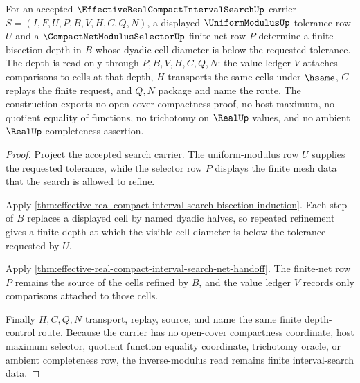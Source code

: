 \begin{theorem}
\label{thm:effective-real-compact-interval-search-dyadic-bisection-inverse-modulus}
For an accepted $\EffectiveRealCompactIntervalSearchUp$ carrier $S=(I,F,U,P,B,V,H,C,Q,N)$, a displayed $\UniformModulusUp$ tolerance row $U$ and a $\CompactNetModulusSelectorUp$ finite-net row $P$ determine a finite bisection depth in $B$ whose dyadic cell diameter is below the requested tolerance. The depth is read only through $P,B,V,H,C,Q,N$: the value ledger $V$ attaches comparisons to cells at that depth, $H$ transports the same cells under $\hsame$, $C$ replays the finite request, and $Q,N$ package and name the route. The construction exports no open-cover compactness proof, no host maximum, no quotient equality of functions, no trichotomy on $\RealUp$ values, and no ambient $\RealUp$ completeness assertion.
\end{theorem}
\begin{proof}
Project the accepted search carrier. The uniform-modulus row $U$ supplies the requested tolerance, while the selector row $P$ displays the finite mesh data that the search is allowed to refine.

Apply \autoref{thm:effective-real-compact-interval-search-bisection-induction}. Each step of $B$ replaces a displayed cell by named dyadic halves, so repeated refinement gives a finite depth at which the visible cell diameter is below the tolerance requested by $U$.

Apply \autoref{thm:effective-real-compact-interval-search-net-handoff}. The finite-net row $P$ remains the source of the cells refined by $B$, and the value ledger $V$ records only comparisons attached to those cells.

Finally $H,C,Q,N$ transport, replay, source, and name the same finite depth-control route. Because the carrier has no open-cover compactness coordinate, host maximum selector, quotient function equality coordinate, trichotomy oracle, or ambient completeness row, the inverse-modulus read remains finite interval-search data.
\end{proof}

